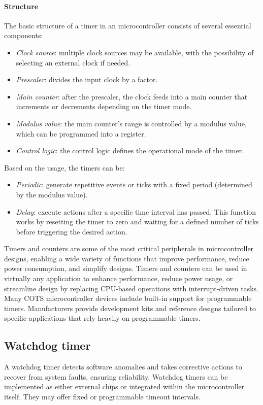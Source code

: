 \paragraph*{Structure}
The basic structure of a timer in an microcontroller consists of several essential components:
\begin{itemize}
    \item \textit{Clock source}: multiple clock sources may be available, with the possibility of selecting an external clock if needed.
    \item \textit{Prescaler}: divides the input clock by a factor. 
    \item \textit{Main counter}: after the prescaler, the clock feeds into a main counter that increments or decrements depending on the timer mode.
    \item \textit{Modulus value}: the main counter's range is controlled by a modulus value, which can be programmed into a register.
    \item \textit{Control logic}: the control logic defines the operational mode of the timer. 
\end{itemize}
Based on the usage, the timers can be: 
\begin{itemize}
    \item \textit{Periodic}: generate repetitive events or ticks with a fixed period (determined by the modulus value). 
    \item \textit{Delay}: execute actions after a specific time interval has passed. 
        This function works by resetting the timer to zero and waiting for a defined number of ticks before triggering the desired action.
\end{itemize}

Timers and counters are some of the most critical peripherals in microcontroller designs, enabling a wide variety of functions that improve performance, reduce power consumption, and simplify designs. 
Timers and counters can be used in virtually any application to enhance performance, reduce power usage, or streamline design by replacing CPU-based operations with interrupt-driven tasks.
Many COTS microcontroller devices include built-in support for programmable timers.
Manufacturers provide development kits and reference designs tailored to specific applications that rely heavily on programmable timers.

\subsection{Watchdog timer}
A watchdog timer detects software anomalies and takes corrective actions to recover from system faults, ensuring reliability.
Watchdog timers can be implemented as either external chips or integrated within the microcontroller itself. 
They may offer fixed or programmable timeout intervals. 

